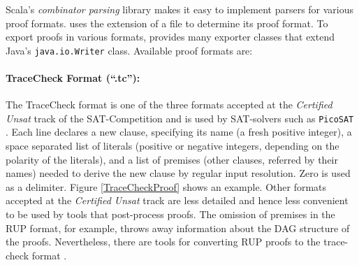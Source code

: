 \documentclass{llncs}
\newcommand{\class}[1]{\texttt{#1}}
\begin{document}
Scala's \emph{combinator parsing} library makes it easy to implement parsers for various proof formats. {\skeptik} uses the extension of a file to  determine its proof format. To export proofs in various formats, {\skeptik} provides many exporter classes that extend Java's \class{java.io.Writer} class. Available proof formats are:

\vspace{-4pt}

\paragraph{TraceCheck Format (``.tc''): }

The TraceCheck format is one of the three formats accepted at the \emph{Certified Unsat} track of the SAT-Competition and is used by SAT-solvers such as \texttt{PicoSAT} \cite{Biere_picosatessentials}. Each line declares a new clause, specifying its name (a fresh positive integer), a space separated list of literals (positive or negative integers, depending on the polarity of the literals), and a list of premises (other clauses, referred by their names) needed to derive the new clause by regular input resolution. Zero is used as a delimiter. Figure \ref{TraceCheckProof} shows an example.
%
Other formats accepted at the \emph{Certified Unsat} track are less detailed and hence less convenient to be used by tools that post-process proofs. The omission of premises in the RUP format, for example, throws away information about the DAG structure of the proofs. Nevertheless, there are tools for converting RUP proofs to the trace-check format \cite{DRUPTrim}.

\end{document}
